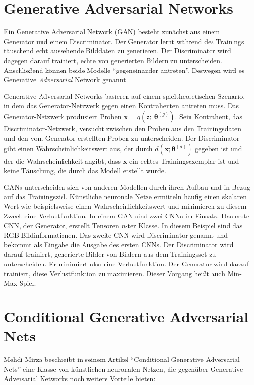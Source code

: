 \section{Generative Adversarial Networks}
\label{gan}
Ein Generative Adversarial Network (GAN) besteht zunächst aus einem Generator und einem Discriminator. Der Generator lernt während des Trainings täuschend echt aussehende Bilddaten zu generieren. Der Discriminator wird dagegen darauf trainiert, echte von generierten Bildern zu unterscheiden. Anschließend können beide Modelle ``gegeneinander antreten''. Deswegen wird es Generative \textit{Adversarial} Network genannt.

Generative Adversarial Networks basieren auf einem spieltheoretischen Szenario, in dem das Generator-Netzwerk gegen einen Kontrahenten antreten muss. Das Generator-Netzwerk produziert Proben $\boldsymbol{x}=g(\boldsymbol{z};\ \boldsymbol{\theta}^{(g)})$. Sein Kontrahent, das Discriminator-Netzwerk, versucht zwischen den Proben aus den Trainingsdaten und den vom Generator erstellten Proben zu unterscheiden. Der Discriminator gibt einen Wahrscheinlichkeitswert aus, der durch $d(\boldsymbol{x}; \boldsymbol{\theta}^{(d)})$ gegeben ist und der die Wahrscheinlichkeit angibt, dass $\boldsymbol{x}$ ein echtes Trainingsexemplar ist und keine Täuschung, die durch das Modell erstellt wurde. \cite{goodfellow2016deeplearning}

GANs unterscheiden sich von anderen Modellen durch ihren Aufbau und in Bezug auf das Trainingsziel. Künstliche neuronale Netze ermitteln häufig einen skalaren Wert wie beispielsweise einen Wahrscheinlichkeitswert und minimieren zu diesem Zweck eine Verlustfunktion. In einem GAN sind zwei CNNs im Einsatz. Das erste CNN, der Generator, erstellt Tensoren $n$-ter Klasse. In diesem Beispiel sind das RGB-Bildinformationen. Das zweite CNN wird Discriminator genannt und bekommt als Eingabe die Ausgabe des ersten CNNs. Der Discriminator wird darauf trainiert, generierte Bilder von Bildern aus dem Trainingsset zu unterscheiden. Er minimiert also eine Verlustfunktion. Der Generator wird darauf trainiert, diese Verlustfunktion zu maximieren. Dieser Vorgang heißt auch Min-Max-Spiel. \cite{goodfellow2014generative}

\section{Conditional Generative Adversarial Nets}
\label{cgan}

Mehdi Mirza beschreibt in seinem Artikel ``Conditional Generative Adversarial Nets'' \cite{mirza2014conditional} eine Klasse von künstlichen neuronalen Netzen, die gegenüber Generative Adversarial Networks noch weitere Vorteile bieten:

